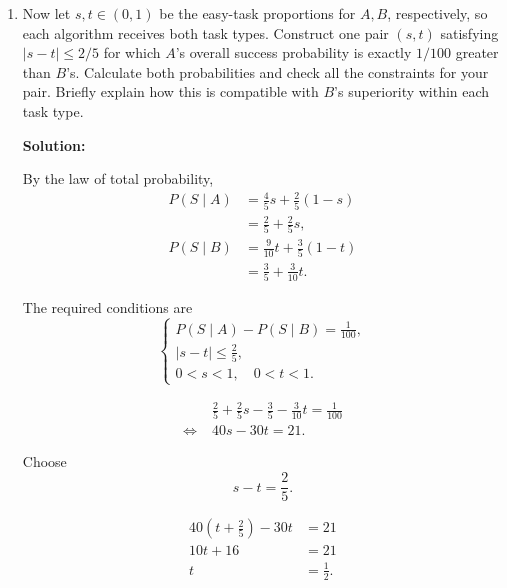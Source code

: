 \documentclass[11pt,a4paper]{article}
\begin{document}
\begin{enumerate}
\[
\therefore\quad t=\frac7{10}.
\]

Substituting,
\[
\begin{aligned}
P(S\mid A)
&=\frac25+\frac25\cdot\frac7{10}\\
&=\frac{17}{25}=0.68,\\[6pt]
P(S\mid B)
&=\frac35+\frac3{10}\cdot\frac7{10}\\
&=\frac{81}{100}=0.81.
\end{aligned}
\]

\[
P(S\mid B)-P(S\mid A)
=\frac{81}{100}-\frac{68}{100}
=\frac{13}{100}.
\]

\[
\therefore\quad
P(S\mid B)>P(S\mid A).
\]


\item Now let $s,t\in(0,1)$ be the easy-task
proportions for $A,B$, respectively, so each
algorithm receives both task types. Construct one
pair $(s,t)$ satisfying $|s-t|\leq2/5$ for which
$A$'s overall success probability is exactly
$1/100$ greater than $B$'s. Calculate both
probabilities and check all the constraints for
your pair. Briefly explain how this is compatible
with $B$'s superiority within each task type.

\textbf{Solution:}

By the law of total probability,
\[
\begin{aligned}
P(S\mid A)
&=\frac45s+\frac25(1-s)\\
&=\frac25+\frac25s,\\[6pt]
P(S\mid B)
&=\frac9{10}t+\frac35(1-t)\\
&=\frac35+\frac3{10}t.
\end{aligned}
\]

The required conditions are
\[
\begin{cases}
P(S\mid A)-P(S\mid B)=\frac1{100},\\
|s-t|\leq\frac25,\\
0<s<1,\quad 0<t<1.
\end{cases}
\]

\[
\begin{aligned}
&\frac25+\frac25s
-\frac35-\frac3{10}t=\frac1{100}\\
\iff\;&40s-30t=21.
\end{aligned}
\]

Choose
\[
s-t=\frac25.
\]

\[
\begin{aligned}
40\left(t+\frac25\right)-30t&=21\\
10t+16&=21\\
t&=\frac12.
\end{aligned}
\]


\end{enumerate}
\end{document}
